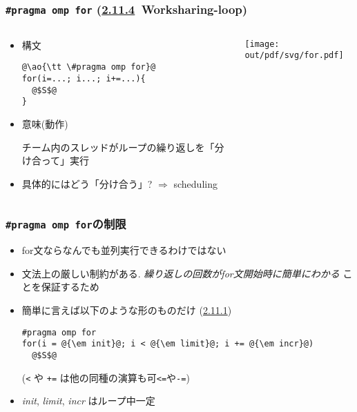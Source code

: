 \documentclass[10pt,dvipdfmx]{beamer}
\newcommand{\sectionompfor}{\href{https://www.openmp.org/spec-html/5.1/openmpsu48.html}{2.11.4}}
\newcommand{\sectioncanonicalloop}{\href{https://www.openmp.org/spec-html/5.1/openmpsu45.html\#x70-700002.11.1}{2.11.1}}
\newcommand{\ao}[1]{{\color{blue}#1}}
\begin{document}
\begin{frame}[fragile]
\frametitle{{\tt \#pragma omp for} (\sectionompfor \ Worksharing-loop)}
\begin{columns}

\begin{column}{0.5\textwidth}
\begin{itemize}
\item 構文
\begin{lstlisting}
@\ao{\tt \#pragma omp for}@
for(i=...; i...; i+=...){
  @$S$@
}
\end{lstlisting}

\item 意味(動作)

チーム内のスレッドがループの繰り返しを「分け合って」実行

\item 具体的にはどう「分け合う」? $\Rightarrow$ scheduling

\end{itemize}
\end{column}

\begin{column}{0.5\textwidth}
\texttt{[image: out/pdf/svg/for.pdf]}
\end{column}
\end{columns}
\end{frame}

\begin{frame}[fragile]
\frametitle{{\tt \#pragma omp for}の制限}
\begin{itemize}
\item for文ならなんでも並列実行できるわけではない
\item 文法上の厳しい制約がある. 
  \ao{\em 繰り返しの回数がfor文開始時に簡単にわかる}
  ことを保証するため
\item 簡単に言えば以下のような形のものだけ (\sectioncanonicalloop)
\begin{lstlisting}
#pragma omp for
for(i = @{\em init}@; i < @{\em limit}@; i += @{\em incr}@) 
  @$S$@
\end{lstlisting}
({\tt <} や {\tt +=} は他の同種の演算も可{\tt <=}や{\tt -=})
\item {\em init}, {\em limit}, {\em incr} はループ中一定
\end{itemize}
\end{frame}

\end{document}
